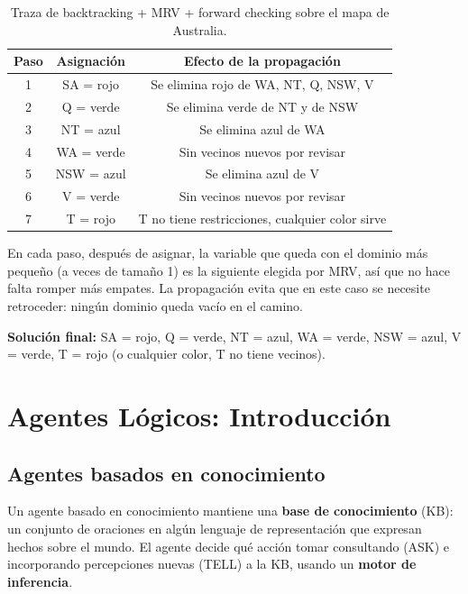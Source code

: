 \begin{exercise}
    \begin{table}[h!]
        \centering
        \begin{tabular}{|c|c|c|}
            \hline
            Paso & Asignación & Efecto de la propagación \\ \hline
            1 & SA = rojo & Se elimina rojo de WA, NT, Q, NSW, V \\ \hline
            2 & Q = verde & Se elimina verde de NT y de NSW \\ \hline
            3 & NT = azul & Se elimina azul de WA \\ \hline
            4 & WA = verde & Sin vecinos nuevos por revisar \\ \hline
            5 & NSW = azul & Se elimina azul de V \\ \hline
            6 & V = verde & Sin vecinos nuevos por revisar \\ \hline
            7 & T = rojo & T no tiene restricciones, cualquier color sirve \\ \hline
        \end{tabular}
        \caption{Traza de backtracking + MRV + forward checking sobre el mapa de Australia.}
        \label{tab:australia_solucion}
    \end{table}

    En cada paso, después de asignar, la variable que queda con el dominio más pequeño (a veces de tamaño 1) es la
    siguiente elegida por MRV, así que no hace falta romper más empates. La propagación evita que en este caso se
    necesite retroceder: ningún dominio queda vacío en el camino.

    \textbf{Solución final:} SA = rojo, Q = verde, NT = azul, WA = verde, NSW = azul, V = verde, T = rojo (o cualquier
    color, T no tiene vecinos).
\end{exercise}

\section{Agentes Lógicos: Introducción}

\subsection{Agentes basados en conocimiento}

Un agente basado en conocimiento mantiene una \textbf{base de conocimiento} (KB): un conjunto de oraciones en algún
lenguaje de representación que expresan hechos sobre el mundo. El agente decide qué acción tomar consultando (ASK) e
incorporando percepciones nuevas (TELL) a la KB, usando un \textbf{motor de inferencia}.

